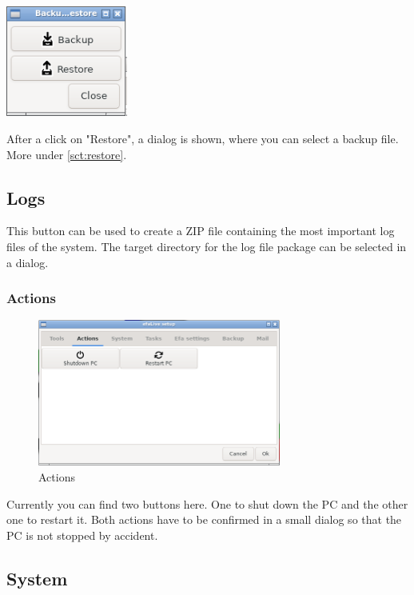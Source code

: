 \documentclass[a4paper,12pt,twoside]{article}
\begin{document}
\bigskip
\begin{minipage}{\linewidth}
    \centering
    \captionsetup{type=figure}
    \includegraphics[width=4cm]{screenshots/efalive_setup_backup_dialog.png}
    \label{fig:dialog_backp}
\end{minipage}
\bigskip

After a click on "Restore", a dialog is shown, where you can select a backup file.
More under \ref{sct:restore}.


\subsection{Logs}
\label{sct:logfiles}
This button can be used to create a ZIP file containing the most important log
files of the system. The target directory for the log file package can be selected
in a dialog.


\subsubsection{Actions}
\label{sct:actions}

\begin{figure}
    \centering
    \includegraphics[width=8cm]{screenshots/efalive_setup_actions.png}
    \caption{Actions}
    \label{fig:efalivesetup_actions}
\end{figure}

Currently you can find two buttons here. One to shut down the PC and the
other one to restart it. Both actions have to be confirmed in a small
dialog so that the PC is not stopped by accident.


\subsection{System}
\label{sct:efalive_system}
\end{document}
